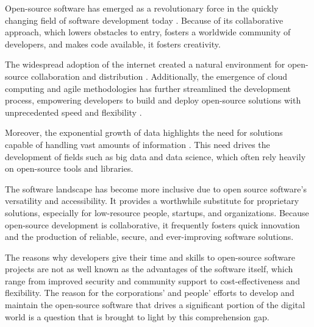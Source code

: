 

Open-source software has emerged as a revolutionary force in the quickly changing field of software development today \cite{fitzgerald2006transformation}. Because of its collaborative approach, which lowers obstacles to entry, fosters a worldwide community of developers, and makes code available, it fosters creativity.

The widespread adoption of the internet created a natural environment for open-source collaboration and distribution \cite{schweik2012internet}. Additionally, the emergence of cloud computing and agile methodologies has further streamlined the development process, empowering developers to build and deploy open-source solutions with unprecedented speed and flexibility \cite{raj2013envisioning}.

Moreover, the exponential growth of data highlights the need for solutions capable of handling vast amounts of information \cite{berman2013principles}. This need drives the development of fields such as big data and data science, which often rely heavily on open-source tools and libraries.

The software landscape has become more inclusive due to open source software's versatility and accessibility. It provides a worthwhile substitute for proprietary solutions, especially for low-resource people, startups, and organizations. Because open-source development is collaborative, it frequently fosters quick innovation and the production of reliable, secure, and ever-improving software solutions.

The reasons why developers give their time and skills to open-source software projects are not as well known as the advantages of the software itself, which range from improved security and community support to cost-effectiveness and flexibility. The reason for the corporations' and people' efforts to develop and maintain the open-source software that drives a significant portion of the digital world is a question that is brought to light by this comprehension gap.

